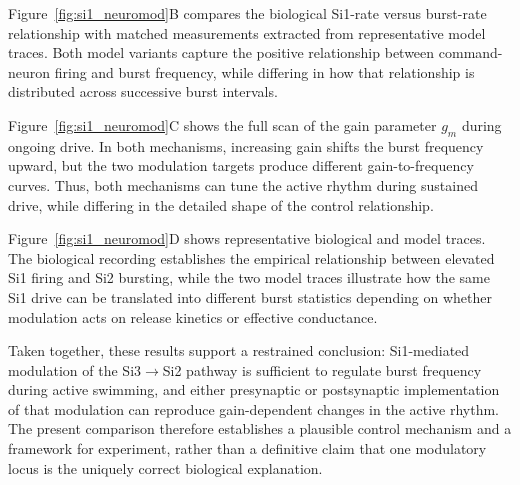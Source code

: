 Figure~\ref{fig:si1_neuromod}B compares the biological Si1-rate versus burst-rate relationship with matched measurements extracted from representative model traces.
Both model variants capture the positive relationship between command-neuron firing and burst frequency, while differing in how that relationship is distributed across successive burst intervals.

Figure~\ref{fig:si1_neuromod}C shows the full scan of the gain parameter $g_m$ during ongoing drive.
In both mechanisms, increasing gain shifts the burst frequency upward, but the two modulation targets produce different gain-to-frequency curves.
Thus, both mechanisms can tune the active rhythm during sustained drive, while differing in the detailed shape of the control relationship.

Figure~\ref{fig:si1_neuromod}D shows representative biological and model traces.
The biological recording establishes the empirical relationship between elevated Si1 firing and Si2 bursting, while the two model traces illustrate how the same Si1 drive can be translated into different burst statistics depending on whether modulation acts on release kinetics or effective conductance.

Taken together, these results support a restrained conclusion: Si1-mediated modulation of the Si3$\to$Si2 pathway is sufficient to regulate burst frequency during active swimming, and either presynaptic or postsynaptic implementation of that modulation can reproduce gain-dependent changes in the active rhythm.
The present comparison therefore establishes a plausible control mechanism and a framework for experiment, rather than a definitive claim that one modulatory locus is the uniquely correct biological explanation.
